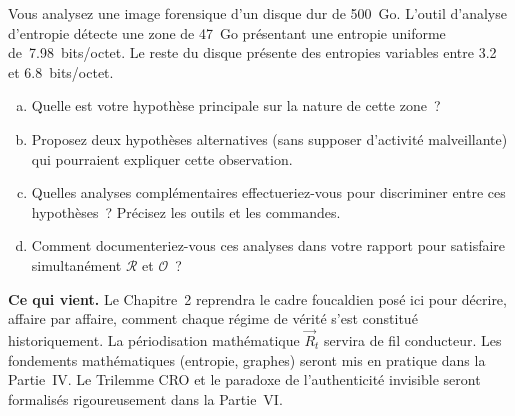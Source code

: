\begin{boxexo}[title={\ding{45}\quad Exercice~1.3 --- Réflexion sur l'entropie \niveauexpert}]
Vous analysez une image forensique d'un disque dur de 500~Go. L'outil
d'analyse d'entropie détecte une zone de 47~Go présentant une entropie
uniforme de~7.98~bits/octet. Le reste du disque présente des entropies
variables entre 3.2 et 6.8~bits/octet.

\begin{enumerate}[(a)]
    \item Quelle est votre hypothèse principale sur la nature de cette zone~?
    \item Proposez deux hypothèses alternatives (sans supposer d'activité
          malveillante) qui pourraient expliquer cette observation.
    \item Quelles analyses complémentaires effectueriez-vous pour discriminer
          entre ces hypothèses~? Précisez les outils et les commandes.
    \item Comment documenteriez-vous ces analyses dans votre rapport pour
          satisfaire simultanément $\mathcal{R}$ et $\mathcal{O}$~?
\end{enumerate}
\end{boxexo}

\bigskip

\begin{boxinfo}
\textbf{Ce qui vient.} Le Chapitre~2 reprendra le cadre foucaldien posé
ici pour décrire, affaire par affaire, comment chaque régime de vérité
s'est constitué historiquement. La périodisation mathématique
$\vec{R}_t$ servira de fil conducteur. Les fondements mathématiques
(entropie, graphes) seront mis en pratique dans la Partie~IV. Le Trilemme
CRO et le paradoxe de l'authenticité invisible seront formalisés
rigoureusement dans la Partie~VI.
\end{boxinfo}
